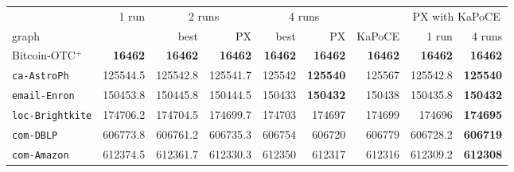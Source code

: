 \begin{tabular}{lrrrrrrrr}
\toprule
 & 1 run & \multicolumn{2}{c}{2 runs} & \multicolumn{2}{c}{4 runs} & & \multicolumn{2}{c}{PX with KaPoCE} \\
\cmidrule(lr){3-4}\cmidrule(lr){5-6}\cmidrule(lr){8-9}
graph & & best & PX & best & PX & KaPoCE & 1 run & 4 runs \\
\midrule
Bitcoin-OTC$^+$ & \textbf{\num{16462}} & \textbf{\num{16462}} & \textbf{\num{16462}} & \textbf{\num{16462}} & \textbf{\num{16462}} & \textbf{\num{16462}} & \textbf{\num{16462}} & \textbf{\num{16462}} \\
\texttt{ca-AstroPh} & \num{125544.5} & \num{125542.8} & \num{125541.7} & \num{125542} & \textbf{\num{125540}} & \num{125567} & \num{125542.8} & \textbf{\num{125540}} \\
\texttt{email-Enron} & \num{150453.8} & \num{150445.8} & \num{150444.5} & \num{150433} & \textbf{\num{150432}} & \num{150438} & \num{150435.8} & \textbf{\num{150432}} \\
\texttt{loc-Brightkite} & \num{174706.2} & \num{174704.5} & \num{174699.7} & \num{174703} & \num{174697} & \num{174699} & \num{174696} & \textbf{\num{174695}} \\
\texttt{com-DBLP} & \num{606773.8} & \num{606761.2} & \num{606735.3} & \num{606754} & \num{606720} & \num{606779} & \num{606728.2} & \textbf{\num{606719}} \\
\texttt{com-Amazon} & \num{612374.5} & \num{612361.7} & \num{612330.3} & \num{612350} & \num{612317} & \num{612316} & \num{612309.2} & \textbf{\num{612308}} \\
\bottomrule
\end{tabular}
